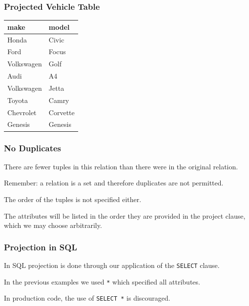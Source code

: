 \begin{frame}
\frametitle{Projected Vehicle Table}

\begin{center}
\begin{tabular}{|l|l|} \hline
\textbf{make} & \textbf{model} \\ \hline
	Honda & Civic \\ \hline
	Ford & Focus \\ \hline
	Volkswagen & Golf \\ \hline
	Audi & A4  \\ \hline
	Volkswagen & Jetta  \\ \hline
	Toyota & Camry \\ \hline
	Chevrolet & Corvette \\ \hline
	Genesis & Genesis \\ \hline
\end{tabular}
\end{center}

\end{frame}



\begin{frame}
\frametitle{No Duplicates}

There are fewer tuples in this relation than there were in the original relation. 

Remember: a relation is a set and therefore duplicates are not permitted. 

The order of the tuples is not specified either. 

The attributes will be listed in the order they are provided in the project clause, which we may choose arbitrarily. 

\end{frame}




\begin{frame}
\frametitle{Projection in SQL}
In SQL projection is done through our application of the \texttt{SELECT} clause. 

In the previous examples we used \texttt{*} which specified all attributes. 

In production code, the use of \texttt{SELECT *} is discouraged.

\end{frame}




